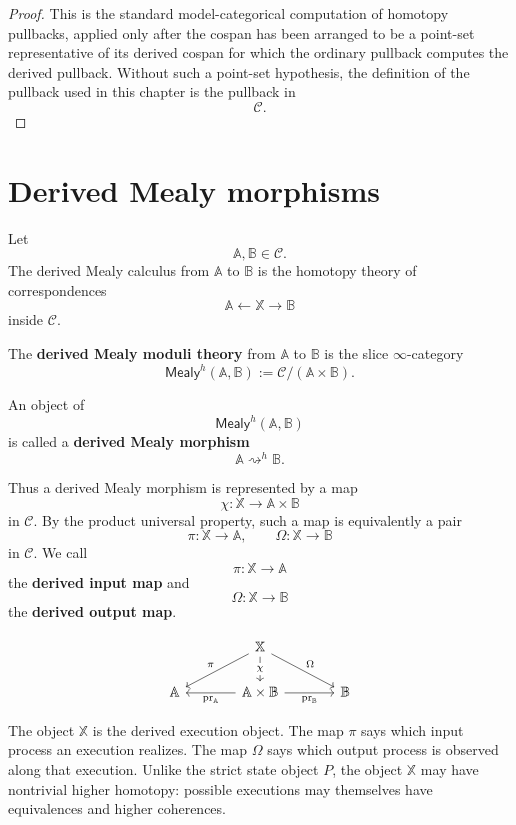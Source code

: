 \begin{proof}
This is the standard model-categorical computation of homotopy
pullbacks, applied only after the cospan has been arranged to be a
point-set representative of its derived cospan for which the ordinary
pullback computes the derived pullback. Without such a point-set
hypothesis, the definition of the pullback used in this chapter is the
pullback in
\[
\mathcal C.
\]
\end{proof}

\section{Derived Mealy morphisms}
\label{sec:derived-mealy-morphisms-definition}

Let
\[
\mathbb A,\mathbb B\in\mathcal C.
\]
The derived Mealy calculus from \(\mathbb A\) to \(\mathbb B\) is the
homotopy theory of correspondences
\[
\mathbb A
\longleftarrow
\mathbb X
\longrightarrow
\mathbb B
\]
inside \(\mathcal C\).

\begin{definition}
\label{def:derived-mealy-moduli-theory-rewritten}
The \textbf{derived Mealy moduli theory} from \(\mathbb A\) to
\(\mathbb B\) is the slice \(\infty\)-category
\[
\mathsf{Mealy}^h(\mathbb A,\mathbb B)
:=
\mathcal C/(\mathbb A\times\mathbb B).
\]

An object of
\[
\mathsf{Mealy}^h(\mathbb A,\mathbb B)
\]
is called a \textbf{derived Mealy morphism}
\[
\mathbb A\rightsquigarrow^h\mathbb B.
\]
\end{definition}

Thus a derived Mealy morphism is represented by a map
\[
\chi:\mathbb X\to\mathbb A\times\mathbb B
\]
in \(\mathcal C\). By the product universal property, such a map is
equivalently a pair
\[
\pi:\mathbb X\to\mathbb A,
\qquad
\Omega:\mathbb X\to\mathbb B
\]
in \(\mathcal C\). We call
\[
\pi:\mathbb X\to\mathbb A
\]
the \textbf{derived input map} and
\[
\Omega:\mathbb X\to\mathbb B
\]
the \textbf{derived output map}.

\[
\begin{tikzcd}[column sep=large]
&
\mathbb X
\arrow[dl, "\pi"']
\arrow[dr, "\Omega"]
\arrow[d, "\chi" description]
&
\\
\mathbb A
&
\mathbb A\times\mathbb B
\arrow[l, "\operatorname{pr}_{\mathbb A}"]
\arrow[r, "\operatorname{pr}_{\mathbb B}"']
&
\mathbb B
\end{tikzcd}
\]

\begin{remark}
\label{rem:derived-morphism-operational-reading}
The object \(\mathbb X\) is the derived execution object. The map
\(\pi\) says which input process an execution realizes. The map
\(\Omega\) says which output process is observed along that execution.
Unlike the strict state object \(P\), the object \(\mathbb X\) may have
nontrivial higher homotopy: possible executions may themselves have
equivalences and higher coherences.
\end{remark}

